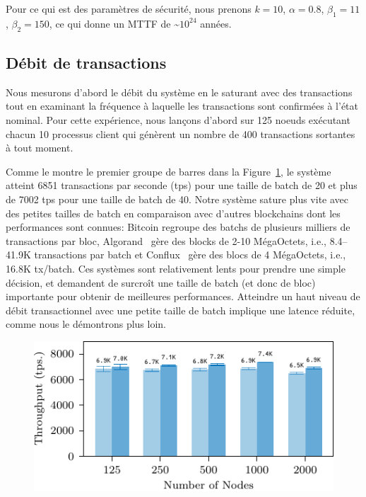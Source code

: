 Pour ce qui est des paramètres de sécurité, nous prenons $k = 10$, $\alpha = 0.8$, $\beta_1 = 11$, $\beta_2 = 150$,
ce qui donne un MTTF de \textasciitilde{}$10^{24}$ années.

\subsection{Débit de transactions}

Nous mesurons d'abord le débit du système en le saturant avec des transactions tout en examinant
la fréquence à laquelle les transactions sont confirmées à l'état nominal. Pour cette expérience, nous lançons
d'abord {\sysname} sur 125 noeuds exécutant chacun 10 processus client qui génèrent un nombre de
400 transactions sortantes à tout moment.

Comme le montre le premier groupe de barres dans la Figure~\ref{fig:eval-thr}, le système atteint 6851
transactions par seconde (tps) pour une taille de batch de 20 et plus de 7002 tps pour une taille de
batch de 40. Notre système sature plus vite avec des petites tailles de batch en comparaison avec d'autres
blockchains dont les performances sont connues: Bitcoin regroupe des batchs de plusieurs milliers de
transactions par bloc, Algorand~\cite{GiladHMVZ17} gère des blocks de 2-10 MégaOctets, i.e., 8.4--41.9K
transactions par batch et Conflux~\cite{confluxLLXLC18} gère des blocs de 4 MégaOctets, i.e., 16.8K tx/batch.
Ces systèmes sont relativement lents pour prendre une simple décision, et demandent de surcroît une taille
de batch (et donc de bloc) importante pour obtenir de meilleures performances. Atteindre un haut niveau de débit
transactionnel avec une petite taille de batch implique une latence réduite, comme nous le démontrons plus loin.

\begin{figure}[h]
\includegraphics[width=\linewidth]{figures/thr-ava.pdf}
\label{fig:eval-thr}
\end{figure}

